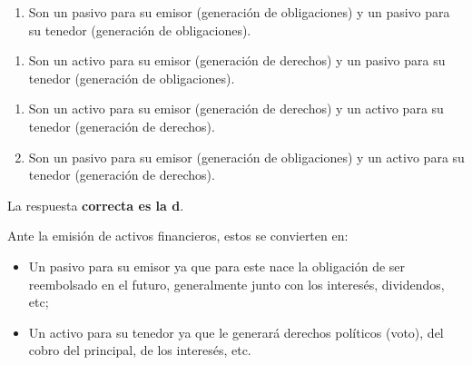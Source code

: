 \documentclass[
  letterpaper,
  DIV=11,
  numbers=noendperiod]{scrreprt}
\providecommand{\tightlist}{%
  \setlength{\itemsep}{0pt}\setlength{\parskip}{0pt}}\usepackage{longtable,booktabs,array}
\begin{document}
\begin{enumerate}
\def\labelenumi{\alph{enumi})}
\tightlist
\item
  Son un pasivo para su emisor (generación de obligaciones) y un pasivo
  para su tenedor (generación de obligaciones).
\end{enumerate}

\begin{enumerate}
\def\labelenumi{\alph{enumi}.}
\setcounter{enumi}{1}
\tightlist
\item
  Son un activo para su emisor (generación de derechos) y un pasivo para
  su tenedor (generación de obligaciones).
\end{enumerate}

\begin{enumerate}
\def\labelenumi{\alph{enumi})}
\setcounter{enumi}{2}
\item
  Son un activo para su emisor (generación de derechos) y un activo para
  su tenedor (generación de derechos).
\item
  Son un pasivo para su emisor (generación de obligaciones) y un activo
  para su tenedor (generación de derechos).
\end{enumerate}

\begin{tcolorbox}[enhanced jigsaw, left=2mm, opacityback=0, colback=white, breakable, arc=.35mm, bottomrule=.15mm, rightrule=.15mm, toprule=.15mm, leftrule=.75mm, colframe=quarto-callout-tip-color-frame]
\begin{minipage}[t]{5.5mm}
\textcolor{quarto-callout-tip-color}{\faLightbulb}
\end{minipage}%
\begin{minipage}[t]{\textwidth - 5.5mm}

La respuesta \textbf{correcta es la d}.

Ante la emisión de activos financieros, estos se convierten en:

\begin{itemize}
\item
  Un pasivo para su emisor ya que para este nace la obligación de ser
  reembolsado en el futuro, generalmente junto con los interesés,
  dividendos, etc;
\item
  Un activo para su tenedor ya que le generará derechos políticos
  (voto), del cobro del principal, de los interesés, etc.
\end{itemize}

\end{minipage}%
\end{tcolorbox}
\end{document}
